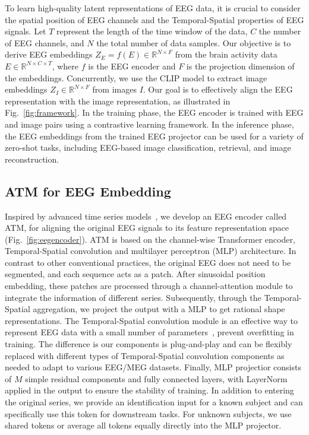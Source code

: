 \documentclass{article}
\begin{document}
To learn high-quality latent representations of EEG data, it is crucial to consider the spatial position of EEG channels and the Temporal-Spatial properties of EEG signals. Let \(T\) represent the length of the time window of the data, \(C\) the number of EEG channels, and \(N\) the total number of data samples. Our objective is to derive EEG embeddings \(Z_E = f(E) \in \mathbb{R}^{N \times F}\) from the brain activity data \(E \in \mathbb{R}^{N \times C \times T}\), where \(f\) is the EEG encoder and \(F\) is the projection dimension of the embeddings. Concurrently, we use the CLIP model to extract image embeddings \(Z_I \in \mathbb{R}^{N \times F}\) from images \(I\). Our goal is to effectively align the EEG representation with the image representation, as illustrated in Fig.~\ref{fig:framework}. In the training phase, the EEG encoder is trained with EEG and image pairs using a contrastive learning framework. In the inference phase, the EEG embeddings from the trained EEG projector can be used for a variety of zero-shot tasks, including EEG-based image classification, retrieval, and image reconstruction.





\subsection{ATM for EEG Embedding}

Inspired by advanced time series models~\cite{liu2023itransformer, gao2024units}, we develop an EEG encoder called ATM, for aligning the original EEG signals to its feature representation space (Fig.~\ref{fig:eegencoder}). ATM is based on the channel-wise Transformer encoder, Temporal-Spatial convolution and multilayer perceptron (MLP) architecture. In contrast to other conventional practices, the original EEG does not need to be segmented, and each sequence acts as a patch. After sinusoidal position embedding, these patches are processed through a channel-attention module to integrate the information of different series. Subsequently, through the Temporal-Spatial aggregation, we project the output with a MLP to get rational shape representations. The Temporal-Spatial convolution module is an effective way to represent EEG data with a small number of parameters~\citep{song2023decoding}, prevent overfitting in training. The difference is our components is plug-and-play and can be flexibly replaced with different types of Temporal-Spatial convolution components as needed to adapt to various EEG/MEG datasets. Finally, MLP projectior consists of \(M\) simple residual components and fully connected layers, with LayerNorm applied in the output to ensure the stability of training. In addition to entering the original series, we provide an identification input for a known subject and can specifically use this token for downstream tasks. For unknown subjects, we use shared tokens or average all tokens equally directly into the MLP projector.
\end{document}
